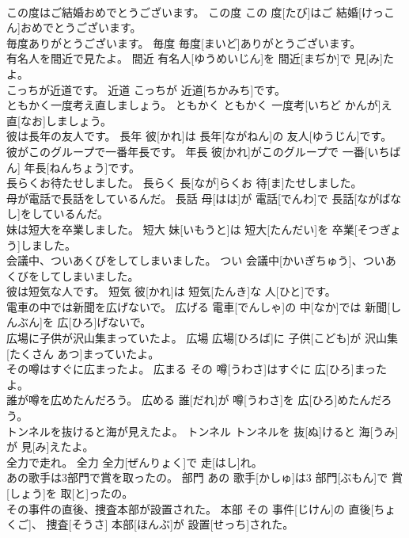 \documentclass[8pt]{extreport}
\begin{document}
\begin{CJK}{UTF8}{min}
\\	この度はご結婚おめでとうございます。	この度	この 度[たび]はご 結婚[けっこん]おめでとうございます。	
\\	毎度ありがとうございます。	毎度	毎度[まいど]ありがとうございます。	
\\	有名人を間近で見たよ。	間近	有名人[ゆうめいじん]を 間近[まぢか]で 見[み]たよ。	
\\	こっちが近道です。	近道	こっちが 近道[ちかみち]です。	
\\	ともかく一度考え直しましょう。	ともかく	ともかく 一度考[いちど かんが]え 直[なお]しましょう。	
\\	彼は長年の友人です。	長年	彼[かれ]は 長年[ながねん]の 友人[ゆうじん]です。	
\\	彼がこのグループで一番年長です。	年長	彼[かれ]がこのグループで 一番[いちばん] 年長[ねんちょう]です。	
\\	長らくお待たせしました。	長らく	長[なが]らくお 待[ま]たせしました。	
\\	母が電話で長話をしているんだ。	長話	母[はは]が 電話[でんわ]で 長話[ながばなし]をしているんだ。	
\\	妹は短大を卒業しました。	短大	妹[いもうと]は 短大[たんだい]を 卒業[そつぎょう]しました。	
\\	会議中、ついあくびをしてしまいました。	つい	会議中[かいぎちゅう]、ついあくびをしてしまいました。	
\\	彼は短気な人です。	短気	彼[かれ]は 短気[たんき]な 人[ひと]です。	
\\	電車の中では新聞を広げないで。	広げる	電車[でんしゃ]の 中[なか]では 新聞[しんぶん]を 広[ひろ]げないで。	
\\	広場に子供が沢山集まっていたよ。	広場	広場[ひろば]に 子供[こども]が 沢山集[たくさん あつ]まっていたよ。	
\\	その噂はすぐに広まったよ。	広まる	その 噂[うわさ]はすぐに 広[ひろ]まったよ。	
\\	誰が噂を広めたんだろう。	広める	誰[だれ]が 噂[うわさ]を 広[ひろ]めたんだろう。	
\\	トンネルを抜けると海が見えたよ。	トンネル	トンネルを 抜[ぬ]けると 海[うみ]が 見[み]えたよ。	
\\	全力で走れ。	全力	全力[ぜんりょく]で 走[はし]れ。	
\\	あの歌手は3部門で賞を取ったの。	部門	あの 歌手[かしゅ]は3 部門[ぶもん]で 賞[しょう]を 取[と]ったの。	
\\	その事件の直後、捜査本部が設置された。	本部	その 事件[じけん]の 直後[ちょくご]、 捜査[そうさ] 本部[ほんぶ]が 設置[せっち]された。	

\end{CJK}
\end{document}
